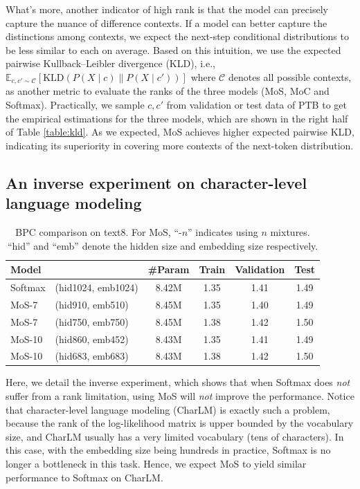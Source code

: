 What's more, another indicator of high rank is that the model can precisely capture the nuance of difference contexts.
If a model can better capture the distinctions among contexts, we expect the next-step conditional distributions to be less similar to each on average. Based on this intuition, we use the expected pairwise Kullback–Leibler divergence (KLD), i.e., $\mathbb{E}_{c, c' \sim \mathcal{C}} \left[ \mathrm{KLD}(P(X \mid c) \| P(X \mid c')) \right]$ where $\mathcal{C}$ denotes all possible contexts, as another metric to evaluate the ranks of the three models (MoS, MoC and Softmax). Practically, we sample $c, c'$ from validation or test data of PTB to get the empirical estimations for the three models, which are shown in the right half of Table \ref{table:kld}. As we expected, MoS achieves higher expected pairwise KLD, indicating its superiority in covering more contexts of the next-token distribution.

\subsection{An inverse experiment on character-level language modeling}
\label{sec:a-charlm}
\begin{table}[!h]
	\centering
	\small
		\begin{tabular}{ll|c|ccc}
			\toprule
			\bf Model && \bf \#Param & \bf Train & \bf Validation & \bf Test \\
			\midrule
			Softmax &(hid1024, emb1024) & 8.42M & 1.35 & 1.41 & 1.49 \\
			MoS-7    &(hid910, emb510)     & 8.45M & 1.35 & 1.40 & 1.49 \\
			MoS-7    &(hid750, emb750)    & 8.45M & 1.38 & 1.42 & 1.50 \\
			MoS-10  &(hid860, emb452)    & 8.43M & 1.35 & 1.41 & 1.49 \\
			MoS-10  &(hid683, emb683)    & 8.43M & 1.38 & 1.42 & 1.50 \\
			\bottomrule
		\end{tabular}
		\caption{\small BPC comparison on text8. For MoS, ``-$n$'' indicates using $n$ mixtures. ``hid'' and ``emb'' denote the hidden size and embedding size respectively.}
		\label{table:charlm}
\end{table}
Here, we detail the inverse experiment, which shows that when Softmax does \textit{not} suffer from a rank limitation, using MoS will \textit{not} improve the performance.
Notice that character-level language modeling (CharLM) is exactly such a problem, because the rank of the log-likelihood matrix is upper bounded by the vocabulary size, and CharLM usually has a very limited vocabulary (tens of characters).
In this case, with the embedding size being hundreds in practice, Softmax is no longer a bottleneck in this task. 
Hence, we expect MoS to yield similar performance to Softmax on CharLM.

